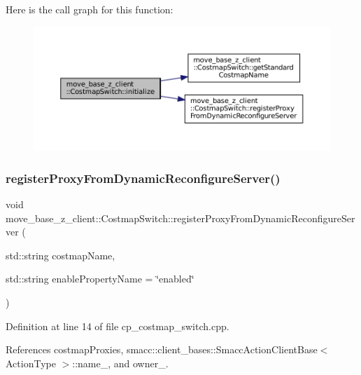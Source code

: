 Here is the call graph for this function\+:
\nopagebreak
\begin{figure}[H]
\begin{center}
\leavevmode
\includegraphics[width=350pt]{classmove__base__z__client_1_1CostmapSwitch_a6708159a16847c912e2d1e44c354983a_cgraph}
\end{center}
\end{figure}
\mbox{\label{classmove__base__z__client_1_1CostmapSwitch_a0282cb1651dd50803e3af0de1436635f}} 
\subsubsection{\texorpdfstring{register\+Proxy\+From\+Dynamic\+Reconfigure\+Server()}{registerProxyFromDynamicReconfigureServer()}}
{\footnotesize\ttfamily void move\+\_\+base\+\_\+z\+\_\+client\+::\+Costmap\+Switch\+::register\+Proxy\+From\+Dynamic\+Reconfigure\+Server (\begin{DoxyParamCaption}\item[{std\+::string}]{costmap\+Name,  }\item[{std\+::string}]{enable\+Property\+Name = {\ttfamily \char`\"{}enabled\char`\"{}} }\end{DoxyParamCaption})}



Definition at line 14 of file cp\+\_\+costmap\+\_\+switch.\+cpp.



References costmap\+Proxies, smacc\+::client\+\_\+bases\+::\+Smacc\+Action\+Client\+Base$<$ Action\+Type $>$\+::name\+\_\+, and owner\+\_\+.




